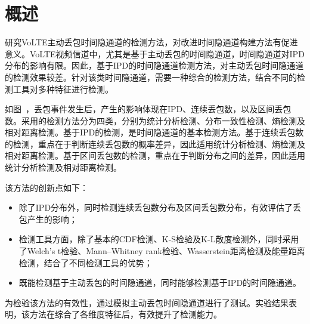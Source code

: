 \section{概述}
\label{chap:analyze:overview}

研究VoLTE主动丢包时间隐通道的检测方法，对改进时间隐通道构建方法有促进意义。VoLTE视频信道中，尤其是基于主动丢包的时间隐通道，时间隐通道对IPD分布的影响有限。因此，基于IPD的时间隐通道检测方法，对主动丢包时间隐通道的检测效果较差。针对该类时间隐通道，需要一种综合的检测方法，结合不同的检测工具对多种特征进行检测。


如图\ ，丢包事件发生后，产生的影响体现在IPD、连续丢包数，以及区间丢包数。采用的检测方法分为四类，分别为统计分析检测、分布一致性检测、熵检测及相对距离检测。基于IPD的检测，是时间隐通道的基本检测方法。基于连续丢包数的检测，重点在于判断连续丢包数的概率差异，因此适用统计分析检测、熵检测及相对距离检测。基于区间丢包数的检测，重点在于判断分布之间的差异，因此适用统计分析检测及相对距离检测。

该方法的创新点如下：
\begin{itemize}
	\item 除了IPD分布外，同时检测连续丢包数分布及区间丢包数分布，有效评估了丢包产生的影响；
	\item 检测工具方面，除了基本的CDF检测、K-S检验及K-L散度检测外，同时采用了Welch's t检验、Mann–Whitney rank检验、Wasserstein距离检测及能量距离检测，结合了不同检测工具的优势；
	\item 既能检测基于主动丢包的时间隐通道，同时能够检测基于IPD的时间隐通道。
\end{itemize}

为检验该方法的有效性，通过模拟主动丢包时间隐通道进行了测试。实验结果表明，该方法在综合了各维度特征后，有效提升了检测能力。